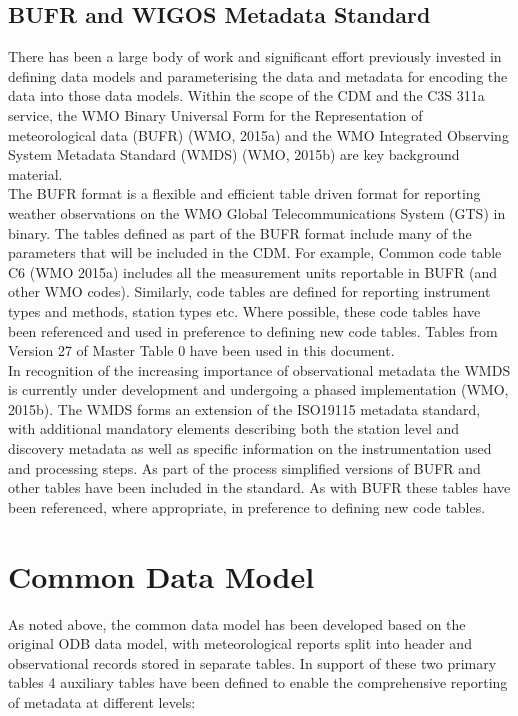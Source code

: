 \documentclass[a4paper,11pt]{article}
\begin{document}


\subsection {BUFR and WIGOS Metadata Standard}
There has been a large body of work and significant effort previously invested in defining data models and parameterising the data and metadata for encoding the data into those data models.  Within the scope of the CDM and the C3S 311a service, the WMO Binary Universal Form for the Representation of meteorological data (BUFR) (WMO, 2015a) and the WMO Integrated Observing System Metadata Standard (WMDS) (WMO, 2015b) are key background material. \\

The BUFR format is a flexible and efficient table driven format for reporting weather observations on the WMO Global Telecommunications System (GTS) in binary. The tables defined as part of the BUFR format include many of the parameters that will be included in the CDM. For example, Common code table C6 (WMO 2015a) includes all the measurement units reportable in BUFR (and other WMO codes). Similarly, code tables are defined for reporting instrument types and methods, station types etc. Where possible, these code tables have been referenced and used in preference to defining new code tables.  Tables from Version 27 of Master Table 0 have been used in this document.\\

In recognition of the increasing importance of observational metadata the WMDS is currently under development and undergoing a phased implementation (WMO, 2015b). The WMDS forms an extension of the ISO19115 metadata standard, with additional mandatory elements describing both the station level and discovery metadata as well as specific information on the instrumentation used and processing steps. As part of the process simplified versions of BUFR and other tables have been included in the standard. As with BUFR these tables have been referenced, where appropriate, in preference to defining new code tables.

\section {Common Data Model}
As noted above, the common data model has been developed based on the original ODB data model, with meteorological reports split into header and observational records stored in separate tables. In support of these two primary tables 4 auxiliary tables have been defined to enable the comprehensive reporting of metadata at different levels:\\
\end{document}
